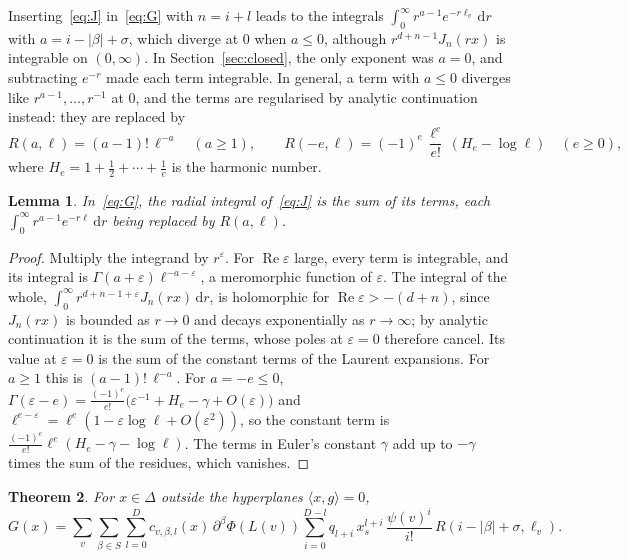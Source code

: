 \documentclass[11pt]{article}
\newtheorem{theorem}{Theorem}[section]
\newtheorem{lemma}[theorem]{Lemma}
\theoremstyle{remark}
\newcommand{\scal}[2]{\langle #1, #2\rangle}
\newcommand{\dd}{\mathrm{d}}
\begin{document}
Inserting~\eqref{eq:J} in~\eqref{eq:G} with $n = i + l$ leads to the
integrals $\int_0^\infty r^{a-1} e^{-r\ell_v} \, \dd r$ with $a = i -
|\beta| + \sigma$, which diverge at $0$ when $a \leq 0$, although
$r^{d+n-1} J_n(rx)$ is integrable on $(0, \infty)$. In
Section~\ref{sec:closed}, the only exponent was $a = 0$, and subtracting
$e^{-r}$ made each term integrable. In general, a term with $a \leq 0$
diverges like $r^{a-1}, \ldots, r^{-1}$ at $0$, and the terms are
regularised by analytic continuation instead: they are replaced by
\begin{equation}\label{eq:R}
  R(a, \ell) = (a - 1)! \, \ell^{-a} \quad (a \geq 1), \qquad
  R(-e, \ell) = (-1)^e \, \frac{\ell^e}{e!} \, (H_e - \log \ell) \quad
  (e \geq 0),
\end{equation}
where $H_e = 1 + \frac12 + \cdots + \frac1e$ is the harmonic number.

\begin{lemma}\label{lem:regularisation}
In~\eqref{eq:G}, the radial integral of~\eqref{eq:J} is the sum of its
terms, each $\int_0^\infty r^{a-1} e^{-r\ell} \, \dd r$ being replaced by
$R(a, \ell)$.
\end{lemma}

\begin{proof}
Multiply the integrand by $r^\varepsilon$. For $\operatorname{Re}
\varepsilon$ large, every term is integrable, and its integral is
$\Gamma(a + \varepsilon) \ell^{-a-\varepsilon}$, a meromorphic function of
$\varepsilon$. The integral of the whole, $\int_0^\infty
r^{d+n-1+\varepsilon} J_n(rx) \, \dd r$, is holomorphic for
$\operatorname{Re} \varepsilon > -(d + n)$, since $J_n(rx)$ is bounded as $r
\to 0$ and decays exponentially as $r \to \infty$; by analytic continuation
it is the sum of the terms, whose poles at $\varepsilon = 0$ therefore
cancel. Its value at $\varepsilon = 0$ is the sum of the constant terms of
the Laurent expansions. For $a \geq 1$ this is $(a-1)! \, \ell^{-a}$. For
$a = -e \leq 0$, $\Gamma(\varepsilon - e) = \frac{(-1)^e}{e!} \bigl(
\varepsilon^{-1} + H_e - \gamma + O(\varepsilon) \bigr)$ and $\ell^{e -
\varepsilon} = \ell^e (1 - \varepsilon \log \ell + O(\varepsilon^2))$, so
the constant term is $\frac{(-1)^e}{e!} \ell^e (H_e - \gamma - \log \ell)$.
The terms in Euler's constant $\gamma$ add up to $-\gamma$ times the sum of
the residues, which vanishes.
\end{proof}

\begin{theorem}\label{thm:G}
For $x \in \Delta$ outside the hyperplanes $\scal{x}{g} = 0$,
\[
  G(x) = \sum_v \sum_{\beta \in S} \sum_{l=0}^{D}
    c_{v,\beta,l}(x) \, \partial^\beta \Phi(L(v))
    \sum_{i=0}^{D-l} q_{l+i} \, x_s^{l+i} \, \frac{\psi(v)^i}{i!} \,
    R(i - |\beta| + \sigma, \ell_v).
\]
\end{theorem}
\end{document}
